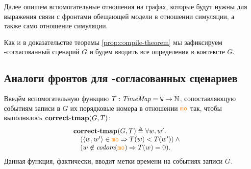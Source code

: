   Далее опишем вспомогательные отношения на графах, которые будут нужны для выражения связи 
с фронтами обещающей модели в отношении симуляции, а также  само отношение симуляции.
  
Как и в доказательстве теоремы \ref{prop:compile-theorem} мы зафиксируем \ARM-согласованный сценарий $G$ и будем вводить
все определения в контексте $G$.
  
\subsection{Аналоги фронтов для \ARM-согласованных сценариев}
\label{sec:view}
  Введём вспомогательную функцию $T: \mathit{TimeMap} = {\mathtt{W}} \rightarrow \mathbb{N}$,
  сопоставляющую событиям записи в $G$ их порядковые номера в отношении $\lCO$ так, чтобы  выполнялось ${\rm \bf correct\text{-}tmap}(G, T)$:
  \[\inarr{
    \correctTmap(G, T) \defeq \forall w, w'. \; \\
    \quad (\tup{w, w'} \in \lCO \implies T(w) < T(w')) \land {} \\
    \quad (w \nin \codom{\lCO} \implies T(w) = 0).
  }\]
  Данная функция, фактически, вводит метки времени на событиях записи $G$.
  
